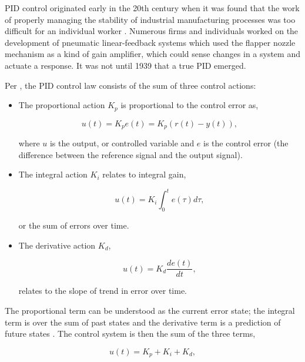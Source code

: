 PID control originated early in the 20th century when it was found that the work of properly managing the stability of industrial manufacturing processes was too difficult for an individual worker \cite{Bennett2001}. Numerous firms and individuals worked on the development of pneumatic linear-feedback systems which used the flapper nozzle mechanism as a kind of gain amplifier, which could sense changes in a system and actuate a response. It was not until 1939 that a true PID emerged.

Per \cite{Soediono1989}, the PID control law consists of the sum of three control actions:

\begin{itemize}
\item The proportional action $K_p$ is proportional to the control error as, 

\begin{equation}
u(t) = K_p e(t) = K_p(r(t) - y(t)),
\end{equation}

where $u$ is the output, or controlled variable and $e$ is the control error (the difference between the reference signal and the output signal). 

\item The integral action $K_i$ relates to integral gain, 

\begin{equation}
u(t) = K_i \int_0^t e(\tau) d\tau,
\end{equation}

or the sum of errors over time. 

\item The derivative action $K_d$, 

\begin{equation}
u(t) = K_d \frac{de(t)}{dt},
\end{equation}

relates to the slope of trend in error over time.
\end{itemize}

The proportional term can be understood as the current error state; the integral term is over the sum of past states and the derivative term is a prediction of future states \cite{Soediono1989}. The control system is then the sum of the three terms, 

\begin{equation}
u(t) = K_p + K_i + K_d,
\end{equation}




